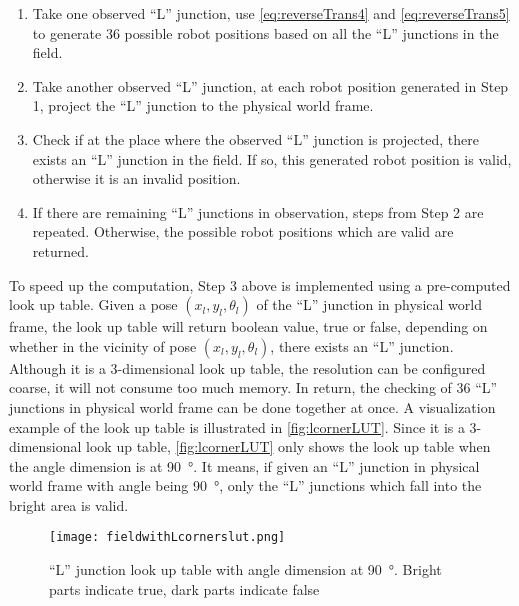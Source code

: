 \begin{enumerate}
  \item Take one observed ``L'' junction, use \autoref{eq:reverseTrans4} and \autoref{eq:reverseTrans5} to generate 36 possible robot positions based on all the ``L'' junctions in the field. 
  \item Take another observed ``L'' junction, at each robot position generated in Step 1, project the ``L'' junction to the physical world frame.
  \item Check if at the place where the observed ``L'' junction is projected, there exists an  ``L'' junction in the field. If so, this generated robot position is valid, otherwise it is an invalid position.
  \item If there are remaining ``L'' junctions in observation, steps from Step 2 are repeated. Otherwise, the possible robot positions which are valid are returned.
\end{enumerate}

To speed up the computation, Step 3 above is implemented using a pre-computed look up table. Given a pose $(x_l, y_l, \theta_l)$ of the ``L'' junction in physical world frame,  the look up table will return boolean value, \ie{} true or false, depending on whether in the vicinity of pose $(x_l, y_l, \theta_l)$, there exists an ``L'' junction. Although it is a 3-dimensional look up table, the resolution can be configured coarse, it will not consume too much memory. In return, the checking of 36 ``L'' junctions in physical world frame can be done together at once. A visualization example of the look up table is illustrated in \autoref{fig:lcornerLUT}. Since it is a 3-dimensional look up table, \autoref{fig:lcornerLUT} only shows the look up table when the angle dimension is at \SI{90}{\degree}. It means, if given an ``L'' junction in physical world frame with angle being \SI{90}{\degree}, only the ``L'' junctions which fall into the bright area is valid. %

\begin{figure}
\begin{center}
	\texttt{[image: fieldwithLcornerslut.png]}
\end{center}
\caption[``L'' junction look up table]{``L'' junction look up table with angle dimension at \SI{90}{\degree}. Bright parts indicate true, dark parts indicate false}
\label{fig:lcornerLUT}
\end{figure}

